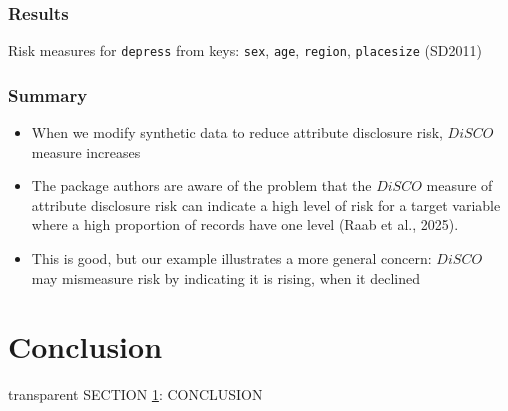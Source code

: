 \documentclass[t,8pt,utfx8]{beamer}
\begin{document}
\begin{spacing}{1.25}
{\begin{itemize}
\end{itemize}


}

\begin{frame}[t]\frametitle{Results}

\begin{table}[!h]
    \centering
    \caption{Risk measures for \texttt{depress} from keys: \texttt{sex}, \texttt{age}, \texttt{region}, \texttt{placesize} (SD2011)}
    
    \label{tab:attribute_risk_sd2011}
\end{table}



\end{frame}

\begin{frame}[t]\frametitle{Summary}

\begin{itemize}
    \item When we modify synthetic data to reduce attribute disclosure risk, $DiSCO$ measure increases
    \item The package authors are aware of the problem that the $DiSCO$ measure of attribute disclosure risk can indicate a high level of risk for a target variable where a high proportion of records have one level (Raab et al., 2025).
    \item This is good, but our example illustrates a more general concern: $DiSCO$ may mismeasure risk by indicating it is rising, when it declined
\end{itemize}

\end{frame}


\section{Conclusion}\label{sec:conclusion}
\begin{frame}[c,plain]
\vskip-4mm
\begin{beamercolorbox}[wd=\boxwidth,ht=22.11mm]{transparent}%
    \vfill%
    \leftinsert%
    \MakeUppercase{Section \ref{sec:conclusion}: Conclusion} %
\end{beamercolorbox}
\vskip-3mm
\end{frame}


\end{spacing}
\end{document}
